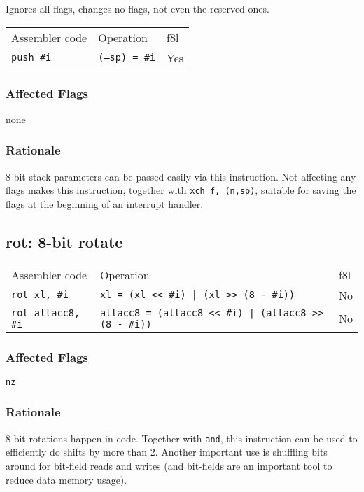 \documentclass{book}
\begin{document}
Ignores all flags, changes no flags, not even the reserved ones.

\begin{tabular}{l l l}
Assembler code    & Operation             & f8l \\
\texttt{push \#i} & \texttt{(--sp) = \#i} & Yes
\end{tabular}

\subsubsection*{Affected Flags}

none

\subsubsection*{Rationale}

8-bit stack parameters can be passed easily via this instruction. Not affecting any flags makes this instruction, together with \texttt{xch f, (n,sp)}, suitable for saving the flags at the beginning of an interrupt handler.

\subsection{rot: 8-bit rotate}

\begin{tabular}{l l l}
Assembler code            & Operation                                                    & f8l \\
\texttt{rot xl, \#i}      & \texttt{xl = (xl << \#i) | (xl >> (8 - \#i))}                & No \\
\texttt{rot altacc8, \#i} & \texttt{altacc8 = (altacc8 << \#i) | (altacc8 >> (8 - \#i))} & No \\
\end{tabular}

\subsubsection*{Affected Flags}

\texttt{nz}

\subsubsection*{Rationale}

8-bit rotations happen in code. Together with \texttt{and}, this instruction can be used to efficiently do shifts by more than 2. Another important use is shuffling bits around for bit-field reads and writes (and bit-fields are an important tool to reduce data memory usage).
\end{document}
